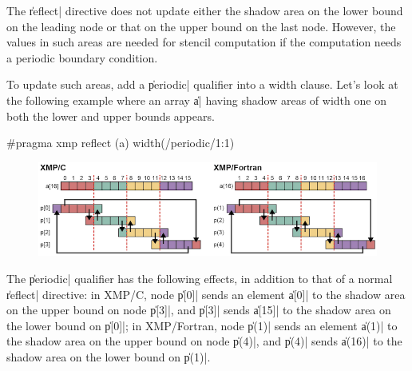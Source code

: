 The \|reflect| directive does not update either the shadow area on the
lower bound on the leading node or that on the upper bound on the last
node. However, the values in such areas are needed for stencil
computation if the computation needs a periodic boundary condition.

To update such areas, add a \|periodic| qualifier into a width
clause. Let’s look at the following example where an array \|a| having
shadow areas of width one on both the lower and upper bounds appears.

\begin{XCexample}
#pragma xmp reflect (a) width(/periodic/1:1)
\end{XCexample}


\begin{figure}
  \centering
  \includegraphics[width=\textwidth]{figs/reflect_periodic.png}
\end{figure}

The \|periodic| qualifier has the following effects, in addition to that of
a normal \|reflect| directive: in XMP/C, node \|p[0]| sends an element
\|a[0]| to the shadow area on the upper bound on node \|p[3]|, and
\|p[3]| sends \|a[15]| to the shadow area on the lower bound on \|p[0]|;
in XMP/Fortran, node \|p(1)| sends an element \|a(1)| to the shadow area
on the upper bound on node \|p(4)|, and \|p(4)| sends \|a(16)| to the
shadow area on the lower bound on \|p(1)|.



